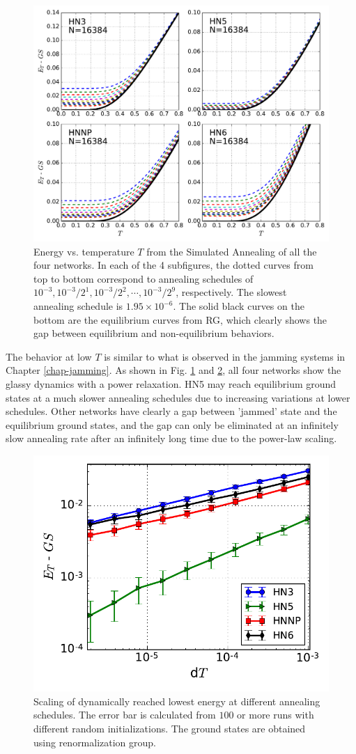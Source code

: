 \begin{figure}[h]
\centering \includegraphics[width=0.9\columnwidth]{Chapter-3/AFM_Jamming_SA_plot}
\protect\caption{Energy vs. temperature $T$ from the Simulated Annealing of all the four networks. In each of the 4 subfigures, the dotted curves from top to bottom correspond to annealing schedules of $10^{-3},  10^{-3}/2^1, 10^{-3}/2^2, \cdots, 10^{-3}/2^9$, respectively. The slowest annealing schedule is $1.95\times10^{-6}$. The solid black curves on the bottom are the equilibrium curves from RG, which clearly shows the gap between equilibrium and non-equilibrium behaviors.}
\label{fig:afm-hnsjam} 
\end{figure}

The behavior at low $T$ is similar to what is observed in the jamming systems in Chapter \ref{chap-jamming}. As shown in Fig. \ref{fig:afm-hnsjam} and \ref{fig:afm-hnsscaling}, all four
 networks show the glassy dynamics with a power relaxation. HN5 may reach equilibrium ground
 states at a much slower annealing schedules due to increasing variations at lower schedules. Other networks have clearly a gap between 'jammed' state and the equilibrium ground states, and the gap can only be eliminated at an infinitely slow annealing rate after an infinitely long time due to the power-law scaling.

\begin{figure}
\centering \includegraphics[width=0.5\columnwidth]{Chapter-3/AFM_Jamming_SA_scaling_plot}
\protect\caption{Scaling of  dynamically reached lowest energy at different annealing schedules. The error bar is calculated from $100$ or more runs with different random initializations. The ground states are obtained using renormalization group.}
\label{fig:afm-hnsscaling} 
\end{figure}

